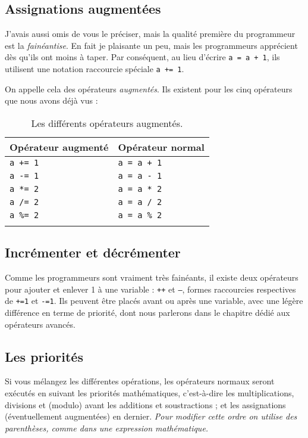 \subsection{Assignations augmentées}


J'avais aussi omis de vous le préciser, mais la qualité première du programmeur est la \emph{fainéantise}. En fait je plaisante un peu, mais les programmeurs apprécient dès qu'ils ont moins à taper.
Par conséquent, au lieu d'écrire \texttt{a = a + 1},
ils utilisent une notation raccourcie spéciale \texttt{a += 1}.

On appelle cela des opérateurs \emph{augmentés}. Ils existent pour les cinq opérateurs que nous avons déjà vus :

\begin{longtabu} to \linewidth {|X[,l,m]|X[,l,m]|}
\hline Opérateur augmenté & Opérateur normal \\ \hline
\endhead
\texttt{a += 1} & \texttt{a = a + 1} \\ \hline
\texttt{a -= 1} & \texttt{a = a - 1} \\ \hline
\texttt{a *= 2} & \texttt{a = a * 2} \\ \hline
\texttt{a /= 2} & \texttt{a = a / 2} \\ \hline
\texttt{a \%= 2} & \texttt{a = a \% 2} \\ \hline
\caption{Les différents opérateurs augmentés.}
\end{longtabu}

\subsection{Incrémenter et décrémenter}
Comme les programmeurs sont vraiment très fainéants, il existe deux opérateurs pour ajouter et enlever 1 à une variable : \texttt{++} et \texttt{--}, formes raccourcies respectives de \texttt{+=1} et \texttt{-=1}. Ils peuvent être placés avant ou après une variable, avec une légère différence en terme de priorité, dont nous parlerons dans le chapitre dédié aux opérateurs avancés.
\subsection{Les priorités}
Si vous mélangez les différentes opérations, les opérateurs normaux seront exécutés en suivant les priorités mathématiques, c'est-à-dire les multiplications, divisions et (modulo) avant les additions et soustractions ; et les assignations (éventuellement augmentées) en dernier.
\emph{Pour modifier cette ordre on utilise des parenthèses, comme dans une expression mathématique.}

